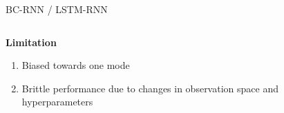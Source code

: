 \documentclass{beamer}
\begin{document}
\begin{frame}[t]{BC-RNN / LSTM-RNN}
    \normalsize
    \begin{columns}
        \hspace{1em}
		\begin{column}{.8\textwidth}
            \pause
            \textbf{Limitation}
            \begin{enumerate}[label=\arabic*.]
                \item Biased towards one mode
                \item Brittle performance due to changes in observation space and hyperparameters
            \end{enumerate}
		\end{column}
        \hspace{-1em}
		\begin{column}{.2\textwidth}
            \begin{center}

\end{center}
\end{column}
\end{columns}
\end{frame}
\end{document}
